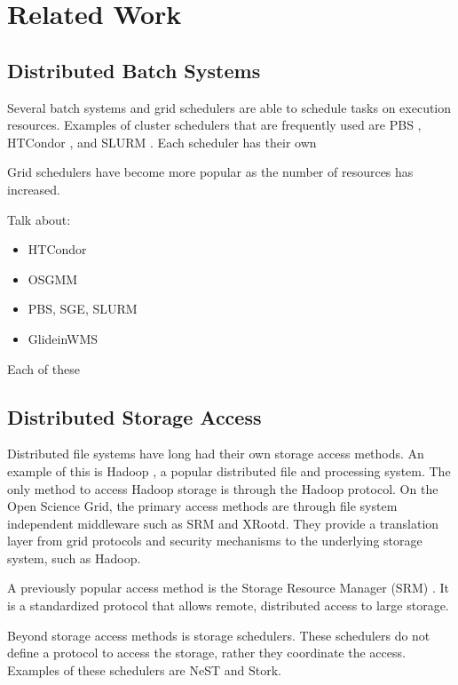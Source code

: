 \chapter{Related Work}
\label{chapter:relatedwork}

\section{Distributed Batch Systems}

Several batch systems and grid schedulers are able to schedule tasks on execution resources.  Examples of cluster schedulers that are frequently used are PBS \cite{pbstorque}, HTCondor \cite{litzkow1988condor}, and SLURM \cite{yoo2003slurm}.  Each scheduler has their own 

Grid schedulers have become more popular as the number of resources has increased.

Talk about:
\begin{itemize}
\item HTCondor
\item OSGMM
\item PBS, SGE, SLURM
\item GlideinWMS
\end{itemize}

Each of these 

\section{Distributed Storage Access}

Distributed file systems have long had their own storage access methods.  An example of this is Hadoop \cite{white2012hadoop}, a popular distributed file and processing system.  The only method to access Hadoop storage is through the Hadoop protocol.  On the Open Science Grid, the primary access methods are through file system independent middleware such as SRM and XRootd.  They provide a translation layer from grid protocols and security mechanisms to the underlying storage system, such as Hadoop.


A previously popular access method is the Storage Resource Manager (SRM) \cite{shoshani2002storage}.  It is a standardized protocol that allows remote, distributed access to large storage.  


Beyond storage access methods is storage schedulers.  These schedulers do not define a protocol to access the storage, rather they coordinate the access.  Examples of these schedulers are NeST and Stork.

